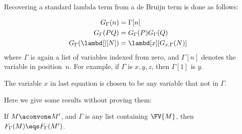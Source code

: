 \documentclass[../../../include/open-logic-section]{subfiles}
\begin{document}
Recovering a standard lambda term from a de Bruijn term is done as
follows:

\begin{defn}
  \begin{align*}
    G_\Gamma(n) &= \Gamma[n] \\
    G_\Gamma(PQ) &= G_\Gamma(P) G_\Gamma(Q) \\
    G_\Gamma(\lambd[][N]) &= \lambd[x][G_{x,\Gamma}(N)]
  \end{align*}
  where $\Gamma$ is again a list of variables indexed from zero, and
  $\Gamma[n]$ denotes the variable in position~$n$. For example,
  if $\Gamma$ is $x,y,z$, then $\Gamma[1]$ is $y$.

  The variable $x$ in last equation is chosen to be any variable that
  not in $\Gamma$.
\end{defn}

Here we give some results without proving them:

\begin{prop}
  If $M \aconvone M'$, and $\Gamma$ is any list containing $\FV{M}$, then
  $F_\Gamma(M) \eqs F_\Gamma(M')$.
\end{prop}
\end{document}
